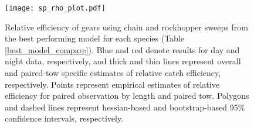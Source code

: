 \documentclass[
  12pt,
]{article}
\begin{document}
\clearpage

\begin{figure}
\caption{Relative efficiency  of gears using chain and rockhopper sweeps from the best performing model for each species (Table \ref{best_model_compare}). Blue and red denote results for day and night data, respectively, and thick and thin lines represent overall and paired-tow specific estimates of relative catch efficiency, respectively. Points represent empirical estimates of relative efficiency for paired observation by length and paired tow. Polygons and dashed lines represent hessian-based and bootstrap-based 95\% confidence intervals, respectively.}\label{sp_rho_plot}
\begin{center}
\texttt{[image: sp\_rho\_plot.pdf]}
\end{center}
\end{figure}

\clearpage
\end{document}
